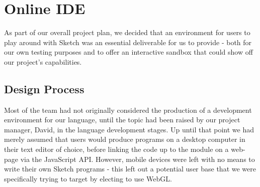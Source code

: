 \documentclass{l3proj}
\begin{document}
\chapter{Online IDE}
\label{ide}
As part of our overall project plan, we decided that an environment for users to play around with Sketch was an essential deliverable for us to provide - both for our own testing purposes and to offer an interactive sandbox that could show off our project's capabilities.

\section{Design Process}
\label{ide-design}
Most of the team had not originally considered the production of a development environment for our language, until the topic had been raised by our project manager, David, in the language development stages. Up until that point we had merely assumed that users would produce programs on a desktop computer in their text editor of choice, before linking the code up to the module on a web-page via the JavaScript API. However, mobile devices were left with no means to write their own Sketch programs - this left out a potential user base that we were specifically trying to target by electing to use WebGL.
\end{document}
